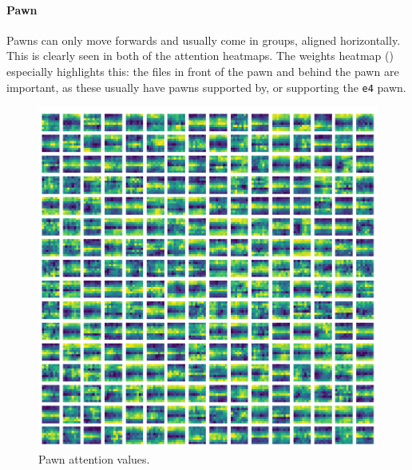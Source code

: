 \paragraph{Pawn} Pawns can only move forwards and usually come in groups,
aligned horizontally. This is clearly seen in both of the attention heatmaps.
The weights heatmap () especially highlights this: the files in
front of the pawn and behind the pawn are important, as these usually have
pawns supported by, or supporting the \texttt{e4} pawn.

\begin{figure}[H]
  \begin{minipage}{0.475\textwidth}
    \centering
    \includegraphics[width=\textwidth]{project/img/attention_maps/P_attention_6.png}
    \caption{Pawn attention values.}
    \label{atnP}
  \end{minipage}
  \hspace{0.05\textwidth}
  \begin{minipage}{0.475\textwidth}
    \centering

\end{minipage}
\end{figure}
